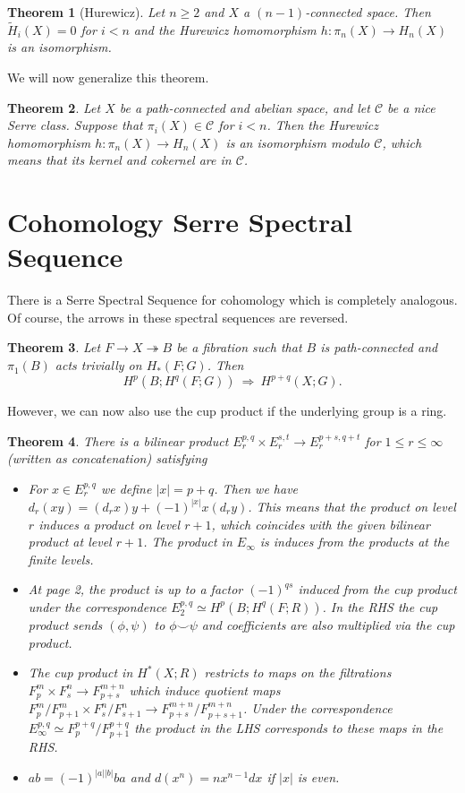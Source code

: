 \documentclass{article}
\newcommand{\mc}[1]{\mathcal{#1}}
\newtheorem{theorem}{Theorem}[section]
\theoremstyle{definition}
\theoremstyle{remark}
\begin{document}
\begin{theorem}[Hurewicz]
Let $n\geq2$ and $X$ a $(n-1)$-connected space. Then $\widetilde H_i(X)=0$ for $i<n$ and the Hurewicz homomorphism $h : \pi_n(X) \to H_n(X)$ is an isomorphism.
\end{theorem}

We will now generalize this theorem.
\begin{theorem}
  Let $X$ be a path-connected and abelian space, and let $\mc C$ be a nice Serre class. Suppose that $\pi_i(X)\in\mc C$ for $i<n$. Then the Hurewicz homomorphism $h:\pi_n(X)\to H_n(X)$ is an isomorphism modulo $\mc{C}$, which means that its kernel and cokernel are in $\mc{C}$.
\end{theorem}

\section{Cohomology Serre Spectral Sequence}

There is a Serre Spectral Sequence for cohomology which is completely analogous. Of course, the
arrows in these spectral sequences are reversed.

\begin{theorem}
Let $F \to X \twoheadrightarrow B$ be a fibration such that $B$ is path-connected and $\pi_1(B)$
acts trivially on $H_*(F;G)$. Then
$$H^p(B;H^q(F;G))\ \Longrightarrow\ H^{p+q}(X;G).$$
\end{theorem}

However, we can now also use the cup product if the underlying group is a ring.

\begin{theorem}
  There is a bilinear product $E_r^{p,q}\times E_r^{s,t}\to E_r^{p+s,q+t}$ for $1\leq r\leq \infty$
  (written as concatenation) satisfying
  \begin{itemize}
  \item For $x\in E^{p,q}_r$ we define $|x|=p+q$. Then we have
    $d_r(xy)=(d_rx)y+(-1)^{|x|}x(d_ry)$. This means that the product on level $r$ induces a product
    on level $r+1$, which coincides with the given bilinear product at level $r+1$. The product in
    $E_\infty$ is induces from the products at the finite levels.
  \item At page 2, the product is up to a factor $(-1)^{qs}$ induced from the cup product under the
    correspondence $E_2^{p,q}\simeq H^p(B;H^q(F;R))$. In the RHS the cup product sends $(\phi,\psi)$
    to $\phi\smallsmile\psi$ and coefficients are also multiplied via the cup product.
  \item The cup product in $H^*(X;R)$ restricts to maps on the filtrations $F_p^m\times F_s^n\to
    F_{p+s}^{m+n}$ which induce quotient maps $F_p^m/F_{p+1}^m\times F_s^n/F_{s+1}^n\to
    F_{p+s}^{m+n}/F_{p+s+1}^{m+n}$. Under the correspondence $E^{p,q}_\infty\simeq
    F^{p+q}_p/F^{p+q}_{p+1}$ the product in the LHS corresponds to these maps in the RHS.
  \item $ab=(-1)^{|a||b|}ba$ and $d(x^n)=nx^{n-1}dx$ if $|x|$ is even.
  \end{itemize}
\end{theorem}
\end{document}
